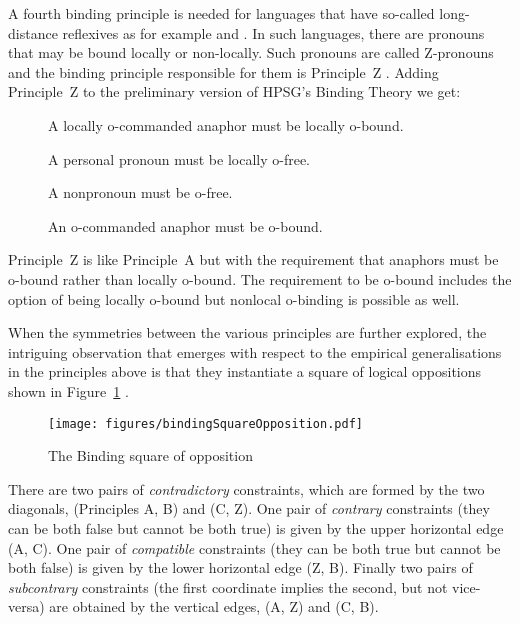 \documentclass[output=paper
	        ,collection
	        ,collectionchapter
 	        ,biblatex
                ,babelshorthands
                ,newtxmath
                ,draftmode
                ,colorlinks, citecolor=brown
]{langscibook}
\begin{document}
A fourth binding principle is needed for languages that have so-called long-distance
reflexives\label{page-long-distance-reflexives} as for example  and 
\citep*{XPS94a-u,PX98a,BM99a}. In such languages, there are pronouns that may be bound locally or
non-locally. Such pronouns are called Z-pronouns and the binding principle responsible for them is
Principle~Z \citep[]{BM99a}. Adding Principle~Z to the preliminary version of HPSG's
Binding Theory we get:
\begin{principle-break}
\begin{description}
\item [] A locally o-commanded anaphor must be locally o-bound.
\item [] A personal pronoun must be locally o-free.
\item [] A nonpronoun must be o-free.
\item [] An o-commanded anaphor must be o-bound.
\end{description}
\end{principle-break}
Principle~Z is like Principle~A but with the requirement that anaphors must be o-bound rather than
locally o-bound. The requirement to be o-bound includes the option of being locally o-bound but
nonlocal o-binding is possible as well. 

When the symmetries between the various principles are further explored, the intriguing observation
that emerges with respect to the empirical generalisations in the principles above is that they
instantiate a square of logical oppositions shown in
Figure~\ref{bindingSquareOpposition} \parencites[Section~11.4]{BM99a}[]{Branco2006a-u}.
\begin{figure}
\centerline{\texttt{[image: figures/bindingSquareOpposition.pdf]}}
\caption{The Binding square of opposition}\label{bindingSquareOpposition}
\end{figure}
There are two pairs of \emph{contradictory} constraints, which are formed
by the two diagonals, (Principles A, B) and (C, Z). One pair of \emph{contrary}
constraints (they can be both false but cannot be both true) is given
by the upper horizontal edge (A, C).  One pair of \emph{compatible}
constraints (they can be both true but cannot be both false) is given
by the lower horizontal edge (Z, B). Finally two pairs of
\emph{subcontrary} constraints (the first coordinate implies the second,
but not vice-versa) are obtained by the vertical edges, (A, Z) and (C, B).
\end{document}
